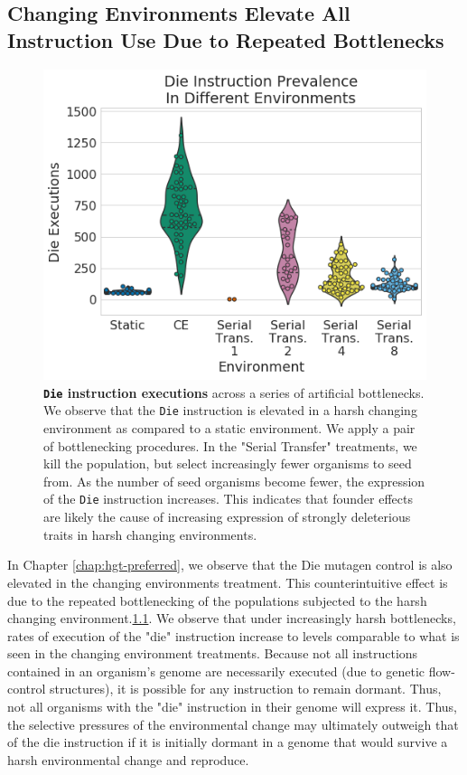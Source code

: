 \documentclass[PhD]{msu-thesis}
\begin{document}
\begin{appendices}
\chapter{Changing Environments Elevate All Instruction Use Due to Repeated Bottlenecks}
	\begin{figure}[h!]
	\begin{center}
	\includegraphics[width=0.75\columnwidth]{figures/HGT/die_bottleneck.png}
	\caption{\textbf{\texttt{Die} instruction executions} across a series of artificial bottlenecks. We observe that the \texttt{Die} instruction is elevated in a harsh changing environment as compared to a static environment. We apply a pair of bottlenecking procedures. In the "Serial Transfer" treatments, we kill the population, but select increasingly fewer organisms to seed from. As the number of seed organisms become fewer, the expression of the \texttt{Die} instruction increases. This indicates that founder effects are likely the cause of increasing expression of strongly deleterious traits in harsh changing environments. 
	}\label{fig:bottlenecks}
	\end{center}
	\end{figure}
In Chapter \ref{chap:hgt-preferred}, we observe that the Die mutagen control is also elevated in the changing environments treatment. This counterintuitive effect is due to the repeated bottlenecking of the populations subjected to the harsh changing environment.\ref{fig:bottlenecks}. We observe that under increasingly harsh bottlenecks, rates of execution of the "die" instruction increase to levels comparable to what is seen in the changing environment treatments. Because not all instructions contained in an organism's genome are necessarily executed (due to genetic flow-control structures), it is possible for any instruction to remain dormant. Thus, not all organisms with the "die" instruction in their genome will express it. Thus, the selective pressures of the environmental change may ultimately outweigh that of the die instruction if it is initially dormant in a genome that would survive a harsh environmental change and reproduce. 




\end{appendices}


\backmatter
\makebibliographypage
\SingleSpacing


\end{document}
